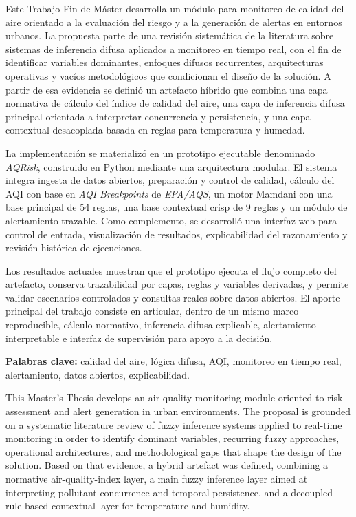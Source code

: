 

Este Trabajo Fin de Máster desarrolla un módulo para monitoreo de calidad del aire orientado a la evaluación del riesgo y a la generación de alertas en entornos urbanos. La propuesta parte de una revisión sistemática de la literatura sobre sistemas de inferencia difusa aplicados a monitoreo en tiempo real, con el fin de identificar variables dominantes, enfoques difusos recurrentes, arquitecturas operativas y vacíos metodológicos que condicionan el diseño de la solución. A partir de esa evidencia se definió un artefacto híbrido que combina una capa normativa de cálculo del índice de calidad del aire, una capa de inferencia difusa principal orientada a interpretar concurrencia y persistencia, y una capa contextual desacoplada basada en reglas para temperatura y humedad.

La implementación se materializó en un prototipo ejecutable denominado \textit{AQRisk}, construido en Python mediante una arquitectura modular. El sistema integra ingesta de datos abiertos, preparación y control de calidad, cálculo del AQI con base en \textit{AQI Breakpoints} de \textit{EPA/AQS}, un motor Mamdani con una base principal de 54 reglas, una base contextual crisp de 9 reglas y un módulo de alertamiento trazable. Como complemento, se desarrolló una interfaz web para control de entrada, visualización de resultados, explicabilidad del razonamiento y revisión histórica de ejecuciones.

Los resultados actuales muestran que el prototipo ejecuta el flujo completo del artefacto, conserva trazabilidad por capas, reglas y variables derivadas, y permite validar escenarios controlados y consultas reales sobre datos abiertos. El aporte principal del trabajo consiste en articular, dentro de un mismo marco reproducible, cálculo normativo, inferencia difusa explicable, alertamiento interpretable e interfaz de supervisión para apoyo a la decisión.

\textbf{Palabras clave:} calidad del aire, lógica difusa, AQI, monitoreo en tiempo real, alertamiento, datos abiertos, explicabilidad.

\clearpage
{}

This Master's Thesis develops an air-quality monitoring module oriented to risk assessment and alert generation in urban environments. The proposal is grounded on a systematic literature review of fuzzy inference systems applied to real-time monitoring in order to identify dominant variables, recurring fuzzy approaches, operational architectures, and methodological gaps that shape the design of the solution. Based on that evidence, a hybrid artefact was defined, combining a normative air-quality-index layer, a main fuzzy inference layer aimed at interpreting pollutant concurrence and temporal persistence, and a decoupled rule-based contextual layer for temperature and humidity.

